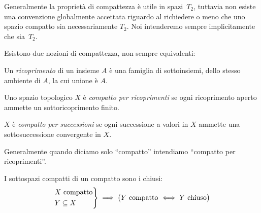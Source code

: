 
Generalmente la proprietà di compattezza è utile in spazi~$T_2$,
tuttavia non esiste una convenzione globalmente accettata
riguardo al richiedere o meno che uno spazio compatto sia necessariamente $T_2$.
Noi intenderemo sempre implicitamente che sia~$T_2$.

Esistono due nozioni di compattezza, non sempre equivalenti:

\begin{defn}[Ricoprimento]
Un \emph{ricoprimento} di un insieme $A$ è una famiglia di sottoinsiemi, dello stesso ambiente di $A$, la cui unione è $A$.
\end{defn}

\begin{defn}
	Uno spazio topologico $X$ è \emph{compatto per ricoprimenti}
	se ogni ricoprimento aperto ammette un sottoricoprimento finito.
\end{defn}

\begin{defn}
	$X$ è \emph{compatto per successioni}
	se ogni successione a valori in $X$ ammette una sottosuccessione convergente in $X$.
\end{defn}

Generalmente quando diciamo solo ``compatto'' intendiamo ``compatto per ricoprimenti''.

\begin{prop}
	I sottospazi compatti di un compatto sono i chiusi:
	\[\begin{rcases}
		\text{$X$ compatto} \\
		Y\subseteq X
	\end{rcases}\implies
	\big(\text{$Y$ compatto $\iff Y$ chiuso}\big)\]
\end{prop}

